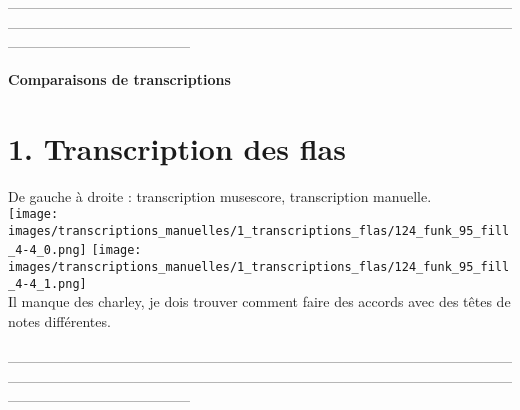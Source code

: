 —————————————————————————————————————————————————————————————————————————————————————\\
\begin{center}
	\textbf{\LARGE{Comparaisons de transcriptions}}
\end{center}
\section*{1. Transcription des flas}
De gauche à droite : transcription musescore, transcription manuelle.\\
\texttt{[image: images/transcriptions\_manuelles/1\_transcriptions\_flas/124\_funk\_95\_fill\_4-4\_0.png]}
\texttt{[image: images/transcriptions\_manuelles/1\_transcriptions\_flas/124\_funk\_95\_fill\_4-4\_1.png]}\\
Il manque des charley, je dois trouver comment faire des accords avec des têtes de notes différentes.\\\\
—————————————————————————————————————————————————————————————————————————————————————\\\\
